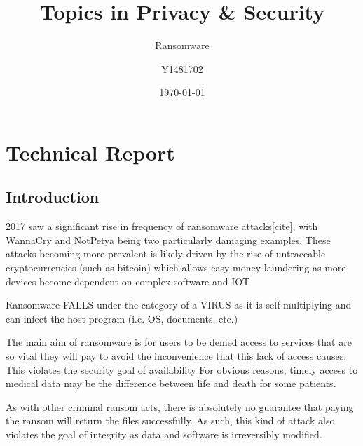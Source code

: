 \documentclass{article}
\title{Topics in Privacy \& Security}
\subtitle{Ransomware}
\author{Y1481702}
\date{\today}
\begin{document}
\begin{titlepage}
\maketitle
\tableofcontents
\end{titlepage}



\section{Technical Report}%
\subsection{Introduction}

2017 saw a significant rise in frequency of ransomware attacks[cite], with WannaCry\cite{wannacry_reuters, wannacry_bbc} and NotPetya\cite{petya_independent} being two particularly damaging examples.
These attacks becoming more prevalent is likely driven by the rise of untraceable cryptocurrencies (such as bitcoin) which allows easy money laundering
as more devices become dependent on complex software and IOT

 

Ransomware FALLS under the category of a VIRUS as it is self-multiplying and can infect the host program (i.e. OS, documents, etc.)

The main aim of ransomware is for users to be denied access to services that are so vital they will pay to avoid the inconvenience that this lack of access causes.
This violates the security goal of availability
For obvious reasons, timely access to medical data may be the difference between life and death for some patients.

As with other criminal ransom acts, there is absolutely no guarantee that paying the ransom will return the files successfully. As such, this kind of attack also violates the goal of integrity as data and software is irreversibly modified.
\end{document}
